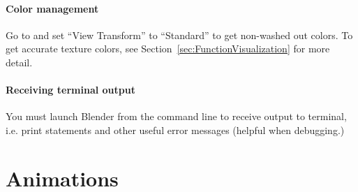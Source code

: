 \documentclass[10pt]{article}
\begin{document}

\subsection{Color management}
\label{sec:GotchaColorManagement}
Go to  and set ``View Transform'' to ``Standard'' to get non-washed out colors. To get accurate texture colors, see Section~\ref{sec:FunctionVisualization} for more detail.

\subsection{Receiving terminal output}
You must launch Blender from the command line to receive output to terminal, i.e. print statements and other useful error messages (helpful when debugging.) 

\part{Animations}
\end{document}
